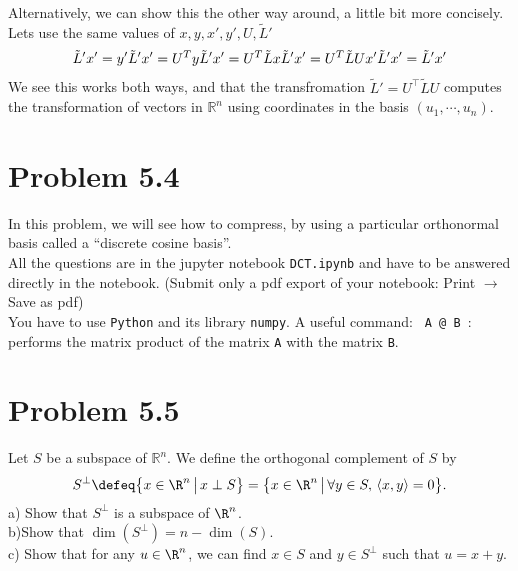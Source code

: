 \documentclass[12pt,twoside]{article}
\begin{document}
Alternatively, we can show this the other way around, a little bit more concisely. Lets use the same values of $x,y,x',y',U, \tilde{L}'$
\begin{equation}
\begin{split}
    \tilde{L}'x' = y'
\end{split}\\
\begin{split}
    \tilde{L}'x' = U^Ty
\end{split}\\
\begin{split}
    \tilde{L}'x' = U^T\tilde{L}x
\end{split}\\
\begin{split}
    \tilde{L}'x' = U^T\tilde{L}Ux'
\end{split}\\
\begin{split}
    \tilde{L}'x' = \tilde{L}'x'
\end{split}
\end{equation}
We see this works both ways, and that the transfromation  $\tilde L ' = U^\top \tilde L U$ computes the transformation of vectors in $\mathbb{R}^n$ using coordinates in the basis $(u_1, \cdots, u_n)$.\\

\section{Problem 5.4}
In this problem, we will see how to compress, by using a particular orthonormal basis called a ``discrete cosine basis''.
\\

All the questions are in the jupyter notebook \texttt{DCT.ipynb} and have to be answered directly in the notebook. (Submit only a pdf export of your notebook: Print $\to$ Save as pdf)
\\

You have to use \texttt{Python} and its library \texttt{numpy}. A useful command:
\texttt{ A @ B }: performs the matrix product of the matrix \texttt{A} with the matrix \texttt{B}.



\section{Problem 5.5}
Let $S$ be a subspace of $\mathbb{R}^n$. We define the orthogonal complement of $S$ by
	$$
	S^{\perp} \defeq 
	\big\{ x \in \R^n \, \big| \, x \perp S \big\} = 
	\big\{ x \in \R^n \, \big| \, \forall y \in S, \, \langle x,y \rangle = 0 \big\}.
	$$
a) Show that $S^{\perp}$ is a subspace of $\R^n$.
\\

b)Show that $\dim(S^{\perp}) = n - \dim(S)$. 
\\
c) Show that for any $u \in \R^n$, we can find $x \in S$ and $y \in S^{\perp}$ such that $u = x + y$.
\end{document}
